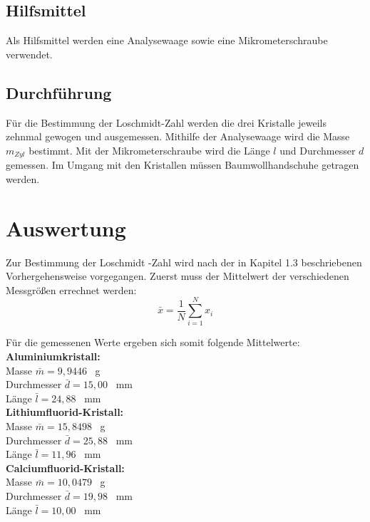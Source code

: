 \documentclass[12pt,a4paper,titlepage,headinclude,bibtotoc]{scrartcl}
\begin{document}
\subsection{Hilfsmittel}
Als Hilfsmittel werden eine Analysewaage sowie eine Mikrometerschraube verwendet.

\subsection{Durchführung}

Für die Bestimmung der Loschmidt-Zahl werden die drei Kristalle jeweils zehnmal gewogen und ausgemessen. Mithilfe der Analysewaage wird die Masse $m_{Zyl}$ bestimmt. Mit der Mikrometerschraube wird die Länge $l$ und Durchmesser $d$ gemessen. Im Umgang mit den Kristallen müssen Baumwollhandschuhe getragen werden. 

\newpage
\section{Auswertung}
Zur Bestimmung der Loschmidt -Zahl wird nach der in Kapitel 1.3 beschriebenen Vorhergehensweise vorgegangen. Zuerst muss der Mittelwert der verschiedenen Messgrößen errechnet werden:
\begin{equation}
\bar{x}=\frac{1}{N} \sum_{i=1}^N x_i
\end{equation}

Für die gemessenen Werte ergeben sich somit folgende Mittelwerte:\\

\vspace{3mm}
\textbf{Aluminiumkristall:}\\
Masse $\bar{m}=9,9446$ \ g \\
Durchmesser $\bar{d}=15,00$ \ mm \\
Länge $\bar{l}=24,88$ \ mm\\

\vspace{3mm}
\textbf{Lithiumfluorid-Kristall:}\\
Masse $\bar{m}=15,8498$ \ g \\
Durchmesser $\bar{d}=25,88$ \ mm \\
Länge $\bar{l}=11,96$ \ mm\\

\vspace{3mm}
\textbf{Calciumfluorid-Kristall:}\\
Masse $\bar{m}=10,0479$ \ g \\
Durchmesser $\bar{d}=19,98$ \ mm \\
Länge $\bar{l}=10,00$ \ mm\\
\end{document}
